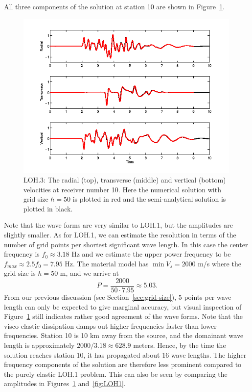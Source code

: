 \documentclass[11pt]{report}
\begin{document}
All three components of the solution at station 10 are shown in Figure~\ref{fig:LOH3}.
\begin{figure}[ht]
  \begin{center}
    \includegraphics[width=0.99\textwidth]{LOH3.png}
    \caption{LOH.3: The radial (top), transverse (middle) and vertical (bottom) velocities at
      receiver number 10. Here the numerical solution with grid size $h=50$ is plotted in red and
      the semi-analytical solution is plotted in black.}
    \label{fig:LOH3}
  \end{center}
\end{figure}
Note that the wave forms are very similar to LOH.1, but the amplitudes are slightly smaller.
As for LOH.1, we can estimate the resolution in terms of the number of grid points per shortest
significant wave length. In this case the center frequency is $f_0\approx 3.18$ Hz and we estimate
the upper power frequency to be $f_{max}\approx 2.5 f_0 = 7.95$ Hz. The material model has $\min V_s
= 2000$ m/s where the grid size is $h=50$ m, and we arrive at
\[
P = \dfrac{2000}{50\cdot 7.95} \approx 5.03.
\]
From our previous discussion (see Section~\ref{sec:grid-size}), 5 points per wave length can only be
expected to give marginal accuracy, but visual inspection of Figure~\ref{fig:LOH3} still indicates
rather good agreement of the wave forms. Note that the visco-elastic dissipation damps out higher
frequencies faster than lower frequencies. Station 10 is 10 km away from the source, and the
domainant wave length is approximately $2000/3.18 \approx 628.9$ meters. Hence, by the time the
solution reaches station 10, it has propagated about 16 wave lengths. The higher frequency
components of the solution are therefore less prominent compared to the purely elastic LOH.1
problem. This can also be seen by comparing the amplitudes in Figures~\ref{fig:LOH3}
and~\ref{fig:LOH1}.
\end{document}
